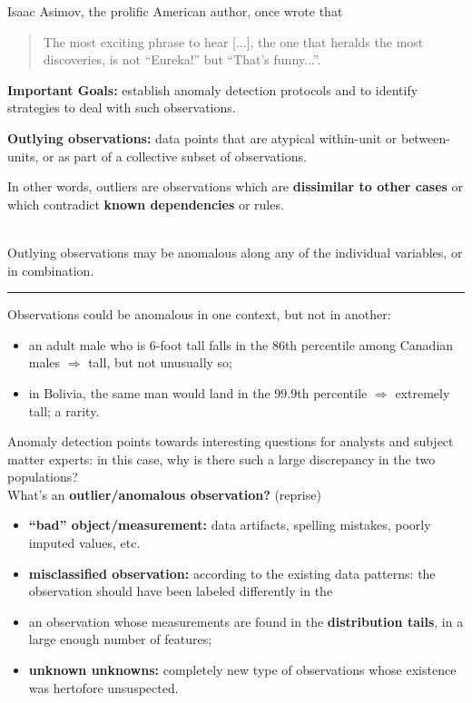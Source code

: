 \documentclass[20pt,landscape,footrule,headrule]{foils}
\def\fh{\foilhead}
\begin{document}
\fh{\textcolor{darkestgreen}{6.1 -- Basic Notions and Overview}} \label{6.1}
\noindent Isaac Asimov, the prolific American author, once wrote that \begin{quote} The most exciting phrase to hear [...], the one that heralds the most discoveries, is not ``Eureka!'' but ``That's funny...''.\end{quote}

\noindent \textbf{Important Goals:} establish anomaly detection protocols  and to identify strategies to deal with such observations.

\noindent \textbf{Outlying observations:} data points that are atypical within-unit or between-units, or as part of a collective subset of observations. 

\noindent In other words, outliers are observations which are \textbf{dissimilar to other cases} or which contradict \textbf{known dependencies} or rules.

\newpage\ \\ \noindent Outlying observations may be anomalous along any of the individual variables, or in combination.
\begin{center}
    \rule{0.5\textwidth}{.4pt}
\end{center}
\noindent Observations could be anomalous in one context, but not in another: 
\begin{itemize}
\item an adult male who is 6-foot tall falls in the $86$th percentile among Canadian males $\Longrightarrow$ tall, but not unusually so; 
\item in Bolivia, the same man would land in the $99.9$th percentile $\Longrightarrow$ extremely tall; a rarity.
\end{itemize}
Anomaly detection points towards interesting questions for analysts and subject matter experts: in this case, why is there such a large discrepancy in the two populations?  
\newpage \ \\ \noindent
What's an \textbf{outlier/anomalous observation?} (reprise)
\begin{itemize}
\item \textbf{``bad'' object/measurement:} data artifacts, spelling mistakes, poorly imputed values, etc.
\item  \textbf{misclassified observation:} according to the existing data patterns: the observation should have been labeled differently in the 
\item  an observation whose measurements are found in the \textbf{distribution tails}, in a large enough number of features;
\item \textbf{unknown unknowns:} completely new type of observations whose existence was hertofore unsuspected.
\end{itemize}
\end{document}
